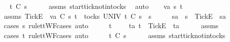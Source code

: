 \begin{isabellebody}
\ \isamarkupfalse%
\ {\isachardoublequoteopen}t\ {\isasymle}\isactrlsub C\ s{}{\isacharprime}{\isachardoublequoteclose}\isanewline
\ \ \ \ \isamarkupfalse%
\ assms{\isacharparenleft}{}{\isacharparenright}\ start{\isacharunderscore}tick{\isacharunderscore}notin{\isacharunderscore}tocks\ \isamarkupfalse%
\ auto\isanewline
{}\isamarkupfalse%
\isanewline
\ \ \isamarkupfalse%
\ va\ s{}{\isacharprime}\ t\isanewline
\ \ \isamarkupfalse%
\ assms{\isacharcolon}\ {\isachardoublequoteopen}{\isacharbrackleft}Tick{\isacharbrackright}\isactrlsub E\ {\isacharhash}\ va\ {\isasymsubseteq}\isactrlsub C\ s{}{\isacharprime}{\isachardoublequoteclose}\ {\isachardoublequoteopen}t\ {\isasymin}\ tocks\ UNIV{\isachardoublequoteclose}\ {\isachardoublequoteopen}t\ {\isasymle}\isactrlsub C\ s{}{\isacharprime}\ {\isacharat}\ s{}{\isachardoublequoteclose}\isanewline
\ \ \isamarkupfalse%
\ \isamarkupfalse%
\ s{}{\isacharprime}a\ \ {\isachardoublequoteopen}s{}{\isacharprime}\ {\isacharequal}\ {\isacharbrackleft}Tick{\isacharbrackright}\isactrlsub E\ {\isacharhash}\ s{}{\isacharprime}a{\isachardoublequoteclose}\isanewline
\ \ \ \ \isamarkupfalse%
\ {\isacharparenleft}cases\ s{}{\isacharprime}\ rule{\isacharcolon}ttWF{\isachardot}cases{\isacharcomma}\ auto{\isacharparenright}\isanewline
\ \ \isamarkupfalse%
\ \isamarkupfalse%
\ {\isachardoublequoteopen}t\ {\isacharequal}\ {\isacharbrackleft}{\isacharbrackright}\ {\isasymor}\ {\isacharparenleft}{\isasymexists}\ ta{\isachardot}\ t\ {\isacharequal}\ {\isacharbrackleft}Tick{\isacharbrackright}\isactrlsub E\ {\isacharhash}\ ta{\isacharparenright}{\isachardoublequoteclose}\isanewline
\ \ \ \ \isamarkupfalse%
\ assms{\isacharparenleft}{}{\isacharparenright}\ \isamarkupfalse%
\ {\isacharparenleft}cases\ t\ rule{\isacharcolon}ttWF{\isachardot}cases{\isacharcomma}\ auto{\isacharparenright}\isanewline
\ \ \isamarkupfalse%
\ \isamarkupfalse%
\ {\isachardoublequoteopen}t\ {\isasymle}\isactrlsub C\ s{}{\isacharprime}{\isachardoublequoteclose}\isanewline
\ \ \ \ \isamarkupfalse%
\ assms{\isacharparenleft}{}{\isacharparenright}\ start{\isacharunderscore}tick{\isacharunderscore}notin{\isacharunderscore}tocks\ \isamarkupfalse%

\end{isabellebody}
